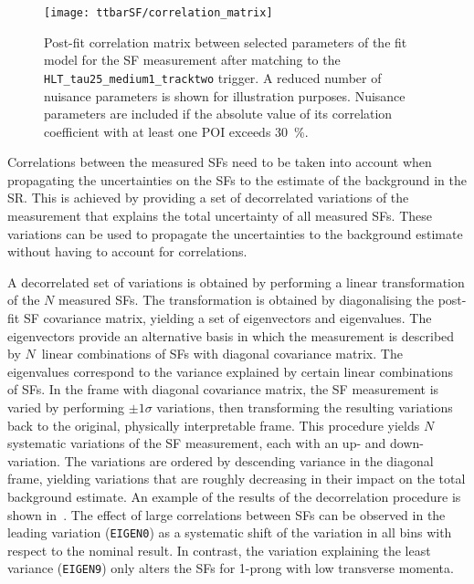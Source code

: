 \begin{figure}[htbp]
  \centering

  \texttt{[image: ttbarSF/correlation\_matrix]}

  \caption{Post-fit correlation matrix between selected parameters of the fit
    model for the \faketauhadvis SF measurement after matching \tauhadvis to the
    \texttt{HLT\_tau25\_medium1\_tracktwo} trigger. A reduced number of nuisance
    parameters is shown for illustration purposes. Nuisance parameters are
    included if the absolute value of its correlation coefficient with at least
    one POI exceeds \SI{30}{\percent}.}%
  \label{fig:ttbarSF_corr_matrix}
\end{figure}

Correlations between the measured SFs need to be taken into account when
propagating the uncertainties on the SFs to the estimate of the \ttbarFakes
background in the \hadhad SR. This is achieved by providing a set of
decorrelated variations of the measurement that explains the total uncertainty
of all measured SFs. These variations can be used to propagate the uncertainties
to the background estimate without having to account for correlations.

A decorrelated set of variations is obtained by performing a linear
transformation of the $N$ measured SFs. The transformation is obtained by
diagonalising the post-fit SF covariance matrix, yielding a set of eigenvectors
and eigenvalues. The eigenvectors provide an alternative basis in which the
measurement is described by $N$~linear combinations of SFs with diagonal
covariance matrix. The eigenvalues correspond to the variance explained by
certain linear combinations of SFs.
In the frame with diagonal covariance matrix, the SF measurement is varied by
performing $\pm 1 \sigma$ variations, then transforming the resulting variations
back to the original, physically interpretable frame. This procedure yields $N$
systematic variations of the SF measurement, each with an up- and
down-variation. The variations are ordered by descending variance in the
diagonal frame, yielding variations that are roughly decreasing in their impact
on the total \ttbarFakes background estimate. An example of the results of the
decorrelation procedure is shown in~. The
effect of large correlations between SFs can be observed in the leading
variation (\texttt{EIGEN0}) as a systematic shift of the variation in all bins
with respect to the nominal result. In contrast, the variation explaining the
least variance (\texttt{EIGEN9}) only alters the SFs for 1-prong \faketauhadvis
with low transverse momenta.

